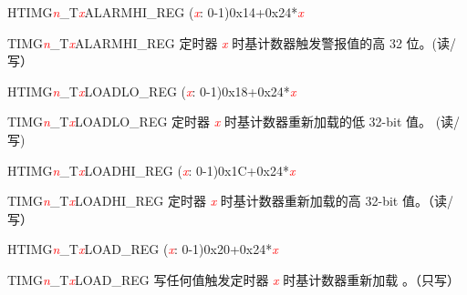 \begin{register}{H}{TIMG\textcolor{red}{\it{n}}\_T\textcolor{red}{\it{x}}ALARMHI\_REG (\textcolor{red}{\it{x}}: 0-1)}{0x14+0x24*\textcolor{red}{\it{x}}}\label{regdesc:TIMERSTnALARMHIREG}
%
\regnewline%
\begin{regdesc}\begin{reglist}
\item [TIMG\textcolor{red}{\it{n}}\_T\textcolor{red}{\it{x}}ALARMHI\_REG]定时器 \textcolor{red}{\it{x}} 时基计数器触发警报值的高 32 位。(读/写）
\end{reglist}\end{regdesc}
\end{register}


\begin{register}{H}{TIMG\textcolor{red}{\it{n}}\_T\textcolor{red}{\it{x}}LOADLO\_REG (\textcolor{red}{\it{x}}: 0-1)}{0x18+0x24*\textcolor{red}{\it{x}}}\label{regdesc:TIMERSTnLOADLOREG}
%
\regnewline%
\begin{regdesc}\begin{reglist}
\item [TIMG\textcolor{red}{\it{n}}\_T\textcolor{red}{\it{x}}LOADLO\_REG] 定时器 \textcolor{red}{\it{x}} 时基计数器重新加载的低 32-bit 值。 (读/写)
\end{reglist}\end{regdesc}
\end{register}


\begin{register}{H}{TIMG\textcolor{red}{\it{n}}\_T\textcolor{red}{\it{x}}LOADHI\_REG (\textcolor{red}{\it{x}}: 0-1)}{0x1C+0x24*\textcolor{red}{\it{x}}}\label{regdesc:TIMERSTnLOADHIREG}
%
\regnewline%
\begin{regdesc}\begin{reglist}
\item [TIMG\textcolor{red}{\it{n}}\_T\textcolor{red}{\it{x}}LOADHI\_REG] 定时器 \textcolor{red}{\it{x}} 时基计数器重新加载的高 32-bit 值。（读/写）
\end{reglist}\end{regdesc}
\end{register}


\begin{register}{H}{TIMG\textcolor{red}{\it{n}}\_T\textcolor{red}{\it{x}}LOAD\_REG (\textcolor{red}{\it{x}}: 0-1)}{0x20+0x24*\textcolor{red}{\it{x}}}\label{regdesc:TIMERSTnLOADREG}
%
\regnewline%
\begin{regdesc}\begin{reglist}
\item [TIMG\textcolor{red}{\it{n}}\_T\textcolor{red}{\it{x}}LOAD\_REG]写任何值触发定时器 \textcolor{red}{\it{x}} 时基计数器重新加载 。（只写）
\end{reglist}\end{regdesc}
\end{register}


